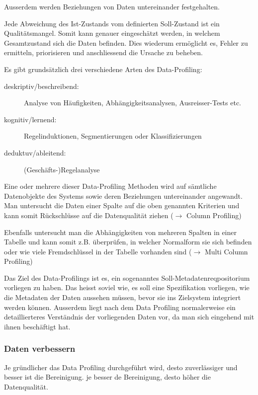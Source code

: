 \documentclass[a4paper, 11pt, nofootinbib]{article}
\begin{document}
Ausserdem werden Beziehungen von Daten untereinander festgehalten. 

Jede Abweichung des Ist-Zustands vom definierten Soll-Zustand ist ein Qualitätsmangel. Somit kann genauer eingeschätzt werden, in welchem Gesamtzustand sich die Daten befinden. Dies wiederum ermöglicht es, Fehler zu ermitteln, priorisieren und anschliessend die Ursache zu beheben.

\vspace{10px}

\noindent Es gibt grundsätzlich drei verschiedene Arten des Data-Profiling:

\begin{description}
\item[deskriptiv/beschreibend: ] Analyse von Häufigkeiten, Abhängigkeitsanalysen, Ausreisser-Tests etc.
\item[kognitiv/lernend: ] Regelinduktionen, Segmentierungen oder Klassifizierungen
\item[deduktuv/ableitend: ] (Geschäfts-)Regelanalyse
\end{description}

Eine oder mehrere dieser Data-Profiling Methoden wird auf sämtliche Datenobjekte des Systems sowie deren Beziehungen untereinander angewandt. Man untersucht die Daten einer Spalte auf die oben genannten Kriterien und kann somit Rückschlüsse auf die Datenqualität ziehen ($\rightarrow$ Column Profiling)

Ebenfalls untersucht man die Abhängigkeiten von mehreren Spalten in einer Tabelle und kann somit z.B. überprüfen, in welcher Normalform sie sich befinden oder wie viele Fremdschlüssel in der Tabelle vorhanden sind ($\rightarrow$ Multi Column Profiling) 

\vspace{10px}

\noindent Das Ziel des Data-Profilings ist es, ein sogenanntes Soll-Metadatenreqpositorium vorliegen zu haben. Das heisst soviel wie, es soll eine Spezifikation vorliegen, wie die Metadaten der Daten aussehen müssen, bevor sie ins Zielsystem integriert werden können. Ausserdem liegt nach dem Data Profiling normalerweise ein detaillierteres Verständnis der vorliegenden Daten vor, da man sich eingehend mit ihnen beschäftigt hat.

\newpage

\subsubsection{Daten verbessern}
Je gründlicher das Data Profiling durchgeführt wird, desto zuverlässiger und besser ist die Bereinigung. je besser de Bereinigung, desto höher die Datenqualität.
\end{document}
